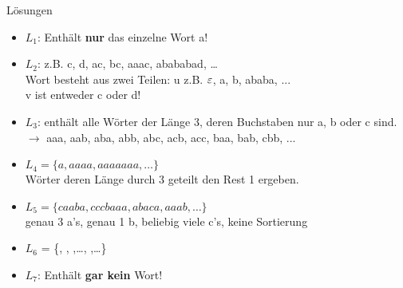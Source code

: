 {
\begin{frame}{Lösungen}
  \begin{itemize}[<+- | alert@+>]
        \item 
            $L_1$: Enthält \textbf{nur} das einzelne Wort a!
        \item
            $L_2$: z.B. c, d, ac, bc, aaac, abababad, \dots\\
            Wort besteht aus zwei Teilen: u z.B. $\varepsilon$, a, b, ababa, ...\\ v ist entweder c oder d!
        \item
            $L_3$: enthält alle Wörter der Länge 3, deren Buchstaben nur a, b oder c sind.\\
            $\rightarrow$ aaa, aab, aba, abb, abc, acb, acc, baa, bab, cbb, ...
        \item
            $L_4 = \{a, aaaa, aaaaaaa, \dots\}$\\
            Wörter deren Länge durch 3 geteilt den Rest 1 ergeben.
        \item
            $L_5 = \{caaba, cccbaaa, abaca, aaab, \dots\}$\\
            genau 3 a's, genau 1 b, beliebig viele c's, keine Sortierung
        \item
            $L_6$ = \{\Stopsign, \Rewind \Stopsign, \MoveUp \Stopsign,\dots\;, \MoveDown \Rewind \MoveDown \Stopsign,\dots\}
            \item $L_7$: Enthält \textbf{gar kein} Wort!
    \end{itemize}
\end{frame}
}
